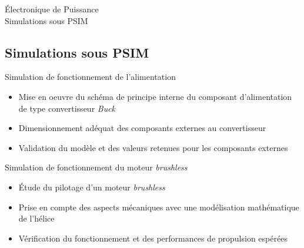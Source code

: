 \documentclass{beamer}
\begin{document}
	\begin{frame}{Électronique de Puissance\\ Simulations sous PSIM}
		\subsection[Simulations]{Simulations sous PSIM}
		Simulation de fonctionnement de l'alimentation
		\begin{itemize}
			\item Mise en oeuvre du schéma de principe interne du composant d'alimentation de type convertisseur \textit{Buck}
			\item Dimensionnement adéquat des composants externes au convertisseur
			\item Validation du modèle et des valeurs retenues pour les composants externes
		\end{itemize}
	\end{frame}	
	
	\begin{frame}
		Simulation de fonctionnement du moteur \textit{brushless}
		\begin{itemize}
			\item Étude du pilotage d'un moteur \textit{brushless}
			\item Prise en compte des aspects mécaniques avec une modélisation mathématique de l'hélice
			\item Vérification du fonctionnement et des performances de propulsion espérées
		\end{itemize}
	\end{frame}	
	
\end{document}
